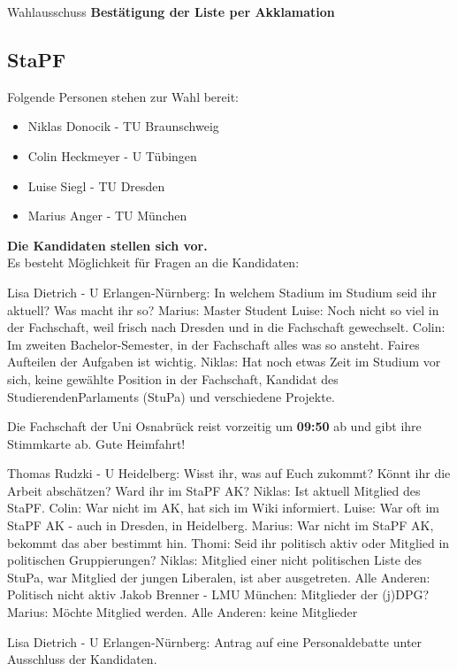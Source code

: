     \begin{success}{Wahlausschuss}
      \textbf{Bestätigung der Liste per Akklamation}
    \end{success}

  \subsection{StaPF}
    Folgende Personen stehen zur Wahl bereit:
    \begin{itemize}
      \item Niklas Donocik - TU Braunschweig
      \item Colin Heckmeyer - U Tübingen
      \item Luise Siegl - TU Dresden
      \item Marius Anger - TU München
    \end{itemize}

    \textbf{Die Kandidaten stellen sich vor.} \\

    Es besteht Möglichkeit für Fragen an die Kandidaten:
    \begin{outline}
      \1 Lisa Dietrich - U Erlangen-Nürnberg:  In welchem Stadium im Studium seid ihr aktuell? Was macht ihr so?
        \2 Marius: Master Student
        \2 Luise: Noch nicht so viel in der Fachschaft, weil frisch nach Dresden und in die Fachschaft gewechselt.
        \2 Colin: Im zweiten Bachelor-Semester, in der Fachschaft alles was so ansteht. Faires Aufteilen der Aufgaben ist wichtig.
        \2 Niklas: Hat noch etwas Zeit im Studium vor sich, keine gewählte Position in der Fachschaft, Kandidat des StudierendenParlaments (StuPa) und verschiedene Projekte.
    \end{outline}

    \begin{info}{}
      Die Fachschaft der Uni Osnabrück reist vorzeitig um \textbf{09:50} ab und gibt ihre Stimmkarte ab. Gute Heimfahrt!
    \end{info}

    \begin{outline}
      \1 Thomas Rudzki - U Heidelberg:  Wisst ihr, was auf Euch zukommt? Könnt ihr die Arbeit abschätzen? Ward ihr im StaPF AK?
        \2 Niklas: Ist aktuell Mitglied des StaPF.
        \2 Colin: War nicht im AK, hat sich im Wiki informiert.
        \2 Luise: War oft im StaPF AK - auch in Dresden, in Heidelberg.
        \2 Marius: War nicht im StaPF AK, bekommt das aber bestimmt hin.
      \1 Thomi: Seid ihr politisch aktiv oder Mitglied in politischen Gruppierungen?
        \2 Niklas: Mitglied einer nicht politischen Liste des StuPa, war Mitglied der jungen Liberalen, ist aber ausgetreten.
        \2 Alle Anderen: Politisch nicht aktiv
      \1 Jakob Brenner - LMU München:  Mitglieder der (j)DPG?
        \2 Marius: Möchte Mitglied werden.
        \2 Alle Anderen: keine Mitglieder
    \end{outline}
    Lisa Dietrich - U Erlangen-Nürnberg:  Antrag auf eine Personaldebatte unter Ausschluss der Kandidaten.


